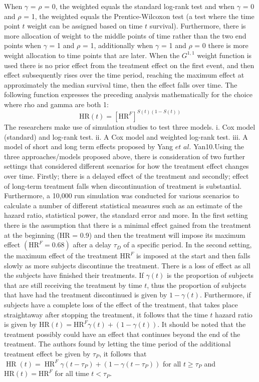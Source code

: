 \documentclass[12pt,twoside]{reedthesis}
\begin{document}
When \(\gamma\) = \(\rho\) = 0, the weighted equals the standard log-rank test and when \(\gamma\) = 0 and \(\rho\) = 1, the weighted equals the Prentice-Wilcoxon test (a test where the time point \(\textit{t}\) weight can be assigned based on time \(\textit{t}\) survival). Furthermore, there is more allocation of weight to the middle points of time rather than the two end points when \(\gamma\) = 1 and \(\rho\) = 1, additionally when \(\gamma\) = 1 and \(\rho\) = 0 there is more weight allocation to time points that are later. When the \(G^{1,1}\) weight function is used there is no prior effect from the treatment effect on the first event, and then effect subsequently rises over the time period, reaching the maximum effect at approximately the median survival time, then the effect falls over time. The following function expresses the preceding analysis mathematically for the choice where rho and gamma are both 1:
\[\mathrm{HR}(t)=\left[\mathrm{HR}^{F}\right]^{S(t)(1-S(t))}\]
The researchers make use of simulation studies to test three models. i. Cox model (standard) and log-rank test. ii. A Cox model and weighted log-rank test. iii. A model of short and long term effects proposed by Yang \(\textit{et al.}\) Yan10.Using the three approaches/models proposed above, there is consideration of two further settings that considered different scenarios for how the treatment effect changes over time. Firstly; there is a delayed effect of the treatment and secondly; effect of long-term treatment falls when discontinuation of treatment is substantial. Furthermore, a 10,000 run simulation was conducted for various scenarios to calculate a number of different statistical measures such as an estimate of the hazard ratio, statistical power, the standard error and more. In the first setting there is the assumption that there is a minimal effect gained from the treatment at the beginning (HR = 0.9) and then the treatment will impose its maximum effect \(\left(\mathrm{HR}^{F}=0.68\right)\) after a delay \(\tau_{D}\) of a specific period. In the second setting, the maximum effect of the treatment \(\mathrm{HR}^{F}\) is imposed at the start and then falls slowly as more subjects discontinue the treatment. There is a loss of effect as all the subjects have finished their treatments. If \(\gamma(t)\) is the proportion of subjects that are still receiving the treatment by time \(\textit{t}\), thus the proportion of subjects that have had the treatment discontinued is given by \(1- \gamma(t)\). Furthermore, if subjects have a complete loss of the effect of the treatment, that takes place straightaway after stopping the treatment, it follows that the time \(\textit{t}\) hazard ratio is given by \(\mathrm{HR}(t)=\mathrm{HR}^{F} \gamma(t)+(1-\gamma(t))\). It should be noted that the treatment possibly could have an effect that continues beyond the end of the treatment. The authors found by letting the time period of the additional treatment effect be given by \(\tau_{P}\), it follows that \(\operatorname{HR}(t)=\operatorname{HR}^{F} \gamma\left(t-\tau_{P}\right)+\left(1-\gamma\left(t-\tau_{P}\right)\right)\) for all \(t \geq \tau_{P}\) and \(\mathrm{HR}(t)=\mathrm{HR}^{F}\) for all time \(t < \tau_{P}\).
\end{document}
